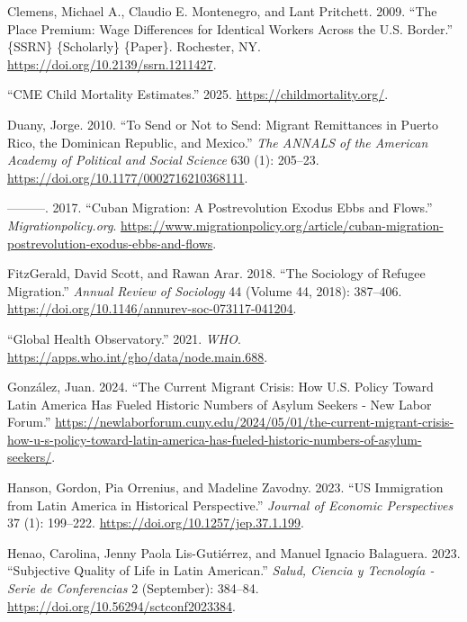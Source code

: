 \documentclass[
]{article}
\newlength{\cslhangindent}
\newenvironment{CSLReferences}[2] %
 {\begin{list}{}{%
  \setlength{\itemindent}{0pt}
  \setlength{\leftmargin}{0pt}
  \setlength{\parsep}{0pt}
  \ifodd #1
   \setlength{\leftmargin}{\cslhangindent}
   \setlength{\itemindent}{-1\cslhangindent}
  \fi
  \setlength{\itemsep}{#2\baselineskip}}}
 {\end{list}}
\begin{document}
\begin{CSLReferences}{1}{0}
Clemens, Michael A., Claudio E. Montenegro, and Lant Pritchett. 2009.
{``The {Place} {Premium}: {Wage} {Differences} for {Identical} {Workers}
{Across} the {U}.{S}. {Border}.''} \{SSRN\} \{Scholarly\} \{Paper\}.
Rochester, NY. \url{https://doi.org/10.2139/ssrn.1211427}.

{``{CME} {Child} {Mortality} {Estimates}.''} 2025.
\url{https://childmortality.org/}.

Duany, Jorge. 2010. {``To {Send} or {Not} to {Send}: {Migrant}
{Remittances} in {Puerto} {Rico}, the {Dominican} {Republic}, and
{Mexico}.''} \emph{The ANNALS of the American Academy of Political and
Social Science} 630 (1): 205--23.
\url{https://doi.org/10.1177/0002716210368111}.

---------. 2017. {``Cuban {Migration}: {A} {Postrevolution} {Exodus}
{Ebbs} and {Flows}.''} \emph{Migrationpolicy.org}.
\url{https://www.migrationpolicy.org/article/cuban-migration-postrevolution-exodus-ebbs-and-flows}.

FitzGerald, David Scott, and Rawan Arar. 2018. {``The {Sociology} of
{Refugee} {Migration}.''} \emph{Annual Review of Sociology} 44 (Volume
44, 2018): 387--406.
\url{https://doi.org/10.1146/annurev-soc-073117-041204}.

{``Global {Health} {Observatory}.''} 2021. \emph{WHO}.
\url{https://apps.who.int/gho/data/node.main.688}.

González, Juan. 2024. {``The {Current} {Migrant} {Crisis}: {How}
{U}.{S}. {Policy} {Toward} {Latin} {America} {Has} {Fueled} {Historic}
{Numbers} of {Asylum} {Seekers} - {New} {Labor} {Forum}.''}
\url{https://newlaborforum.cuny.edu/2024/05/01/the-current-migrant-crisis-how-u-s-policy-toward-latin-america-has-fueled-historic-numbers-of-asylum-seekers/}.

Hanson, Gordon, Pia Orrenius, and Madeline Zavodny. 2023. {``{US}
{Immigration} from {Latin} {America} in {Historical} {Perspective}.''}
\emph{Journal of Economic Perspectives} 37 (1): 199--222.
\url{https://doi.org/10.1257/jep.37.1.199}.

Henao, Carolina, Jenny Paola Lis-Gutiérrez, and Manuel Ignacio
Balaguera. 2023. {``Subjective {Quality} of {Life} in {Latin}
{American}.''} \emph{Salud, Ciencia y Tecnología - Serie de
Conferencias} 2 (September): 384--84.
\url{https://doi.org/10.56294/sctconf2023384}.


\end{CSLReferences}
\end{document}
